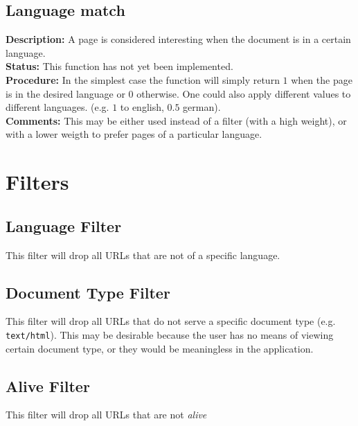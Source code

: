 \documentclass[a4paper]{danarticle}
\begin{document}
     \subsection*{Language match}
       \textbf{Description:} A page is considered interesting when the document
       is in a certain language.
       \\
       \textbf{Status:} This function has not yet been implemented.
       \\
       \textbf{Procedure:} In the simplest case the function will simply
       return $ 1 $ when the page is in the desired language or $ 0 $ otherwise.
       One could also apply different values to different languages. (e.g. $1$
       to english, $0.5$ german).
       \\
       \textbf{Comments:} This may be either used instead of a filter (with 
       a high weight), or with a lower weigth to prefer pages of a particular
       language.
   \section*{Filters}
     \subsection*{Language Filter}
       This filter will drop all URLs that are not of a specific language.
     \subsection*{Document Type Filter}
       This filter will drop all URLs that do not serve a specific document type
       (e.g. \verb!text/html!). This may be desirable because the user has no
       means of viewing certain document type, or they would be meaningless in
       the application.
     \subsection*{Alive Filter}
       This filter will drop all URLs that are not \textit{alive}
\end{document}
